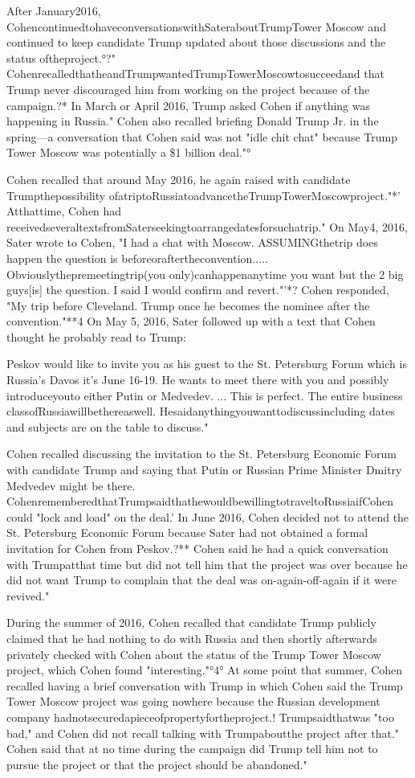 After January2016, CohencontinuedtohaveconversationswithSateraboutTrumpTower Moscow and continued to keep candidate Trump updated about those discussions and the status oftheproject.°?"
CohenrecalledthatheandTrumpwantedTrumpTowerMoscowtosucceedand that Trump never discouraged him from working on the project because of the campaign.?*
In March or April 2016, Trump asked Cohen if anything was happening in Russia."
Cohen also recalled briefing Donald Trump Jr. in the spring—a conversation that Cohen said was not "idle chit chat" because Trump Tower Moscow was potentially a \$1 billion deal."°

Cohen recalled that around May 2016, he again raised with candidate Trumpthepossibility ofatriptoRussiatoadvancetheTrumpTowerMoscowproject."*'
Atthattime, Cohen had receivedseveraltextsfromSaterseekingtoarrangedatesforsuchatrip."
On May4, 2016, Sater wrote to Cohen, "I had a chat with Moscow.
ASSUMINGthetrip does happen the question is beforeoraftertheconvention.....
Obviouslythepremeetingtrip(you only)canhappenanytime you want but the 2 big guys[is] the question.
I said I would confirm and revert."'*?
Cohen responded, "My trip before Cleveland.
Trump once he becomes the nominee after the convention."**4
On May 5, 2016, Sater followed up with a text that Cohen thought he probably read to Trump:

Peskov would like to invite you as his guest to the St. Petersburg Forum which is Russia's Davos it's June 16-19.
He wants to meet there with you and possibly introduceyouto either Putin or Medvedev. ...
This is perfect.
The entire business classofRussiawillbethereaswell.
Hesaidanythingyouwanttodiscussincluding dates and subjects are on the table to discuss."

Cohen recalled discussing the invitation to the St. Petersburg Economic Forum with candidate Trump and saying that Putin or Russian Prime Minister Dmitry Medvedev might be there.
CohenrememberedthatTrumpsaidthathewouldbewillingtotraveltoRussiaifCohen could "lock and load" on the deal.'
In June 2016, Cohen decided not to attend the St. Petersburg Economic Forum because Sater had not obtained a formal invitation for Cohen from Peskov.?**
Cohen said he had a quick conversation with Trumpatthat time but did not tell him that the project was over because he did not want Trump to complain that the deal was on-again-off-again if it were revived."

During the summer of 2016, Cohen recalled that candidate Trump publicly claimed that he had nothing to do with Russia and then shortly afterwards privately checked with Cohen about the status of the Trump Tower Moscow project, which Cohen found "interesting."°4°
At some point that summer, Cohen recalled having a brief conversation with Trump in which Cohen said the Trump Tower Moscow project was going nowhere because the Russian development company hadnotsecuredapieceofpropertyfortheproject.!
Trumpsaidthatwas "too bad," and Cohen did not recall talking with Trumpaboutthe project after that."
Cohen said that at no time during the campaign did Trump tell him not to pursue the project or that the project should be abandoned."

